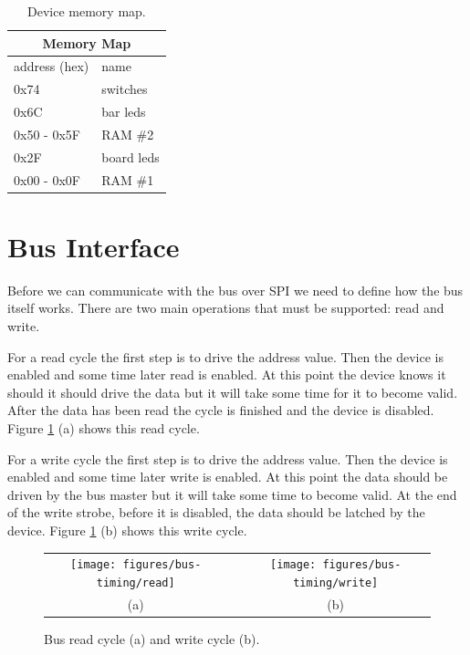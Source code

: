 \documentclass{article}
\begin{document}
\begin{table}[hbp]
\center
\begin{tabular}{|l|l|}
    \hline
    \multicolumn{2}{|c|}{\textbf{Memory Map}} \\
    \hline
    address (hex) & name \\
    \hline
    0x74 & switches \\
    0x6C & bar leds \\
    0x50 - 0x5F & RAM \#2 \\
    0x2F & board leds \\
    0x00 - 0x0F & RAM \#1 \\
    \hline
\end{tabular}
\caption{Device memory map.}
\label{tbl:memmap}
\end{table}



\section{Bus Interface}
\label{sec:bus}

Before we can communicate with the bus over SPI we need
to define how the bus itself works.
There are two main operations that must be supported: read and write.

For a read cycle the first step is to drive the address value.
Then the device is enabled and some time later read is enabled.
At this point the device knows it should it should drive the
data but it will take some time for it to become valid.
After the data has been read the cycle is finished and the device is disabled.
Figure \ref{fig:bus_cycle} (a) shows this read cycle.

For a write cycle the first step is to drive the address value.
Then the device is enabled and some time later write is enabled.
At this point the data should be driven by the bus master
but it will take some time to become valid.
At the end of the write strobe, before it is disabled,
the data should be latched by the device.
Figure \ref{fig:bus_cycle} (b) shows this write cycle.

\begin{figure}
\center

\begin{tabular}{ccc}
\texttt{[image: figures/bus-timing/read]} & \quad &
\texttt{[image: figures/bus-timing/write]} \\
(a) && (b) 
\end{tabular}

\caption{Bus read cycle (a) and write cycle (b).}
\label{fig:bus_cycle}
\end{figure}
\end{document}
